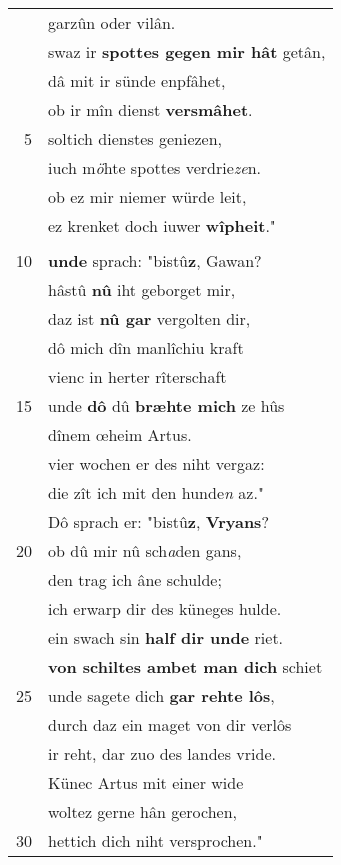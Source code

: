\documentclass[8pt,a4paper,notitlepage]{article}
\begin{document}
\begin{table}[ht]
\begin{minipage}[t]{0.5\linewidth}
\begin{center}
\end{center}
\begin{tabular}{rl}
 & garzûn oder vilân.\\ 
 & swaz ir \textbf{spottes gegen mir hât} getân,\\ 
 & dâ mit ir sünde enpfâhet,\\ 
 & ob ir mîn dienst \textbf{versmâhet}.\\ 
5 & soltich dienstes geniezen,\\ 
 & iuch m\textit{ö}hte spottes verdrie\textit{ze}n.\\ 
 & ob ez mir niemer würde leit,\\ 
 & ez krenket doch iuwer \textbf{wîpheit}."\\ 
 & \textit{\begin{large}W\end{large}}ider \textbf{reit zim} der wunde man\\ 
10 & \textbf{unde} sprach: "bistû\textbf{z}, Gawan?\\ 
 & hâstû \textbf{nû} iht geborget mir,\\ 
 & daz ist \textbf{nû gar} vergolten dir,\\ 
 & dô mich dîn manlîchiu kraft\\ 
 & vienc in herter rîterschaft\\ 
15 & unde \textbf{dô} dû \textbf{bræhte mich} ze hûs\\ 
 & dînem œheim Artus.\\ 
 & vier wochen er des niht vergaz:\\ 
 & die zît ich mit den hunde\textit{n} az."\\ 
 & Dô sprach er: "bistû\textbf{z}, \textbf{Vryans}?\\ 
20 & ob dû mir nû sch\textit{a}den gans,\\ 
 & den trag ich âne schulde;\\ 
 & ich erwarp dir des küneges hulde.\\ 
 & ein swach sin \textbf{half dir unde} riet.\\ 
 & \textbf{von schiltes ambet man dich} schiet\\ 
25 & unde sagete dich \textbf{gar rehte lôs},\\ 
 & durch daz ein maget von dir verlôs\\ 
 & ir reht, dar zuo des landes vride.\\ 
 & Künec Artus mit einer wide\\ 
 & woltez gerne hân gerochen,\\ 
30 & hettich dich niht versprochen."\\ 

\end{tabular}
\end{minipage}
\end{table}
\end{document}
